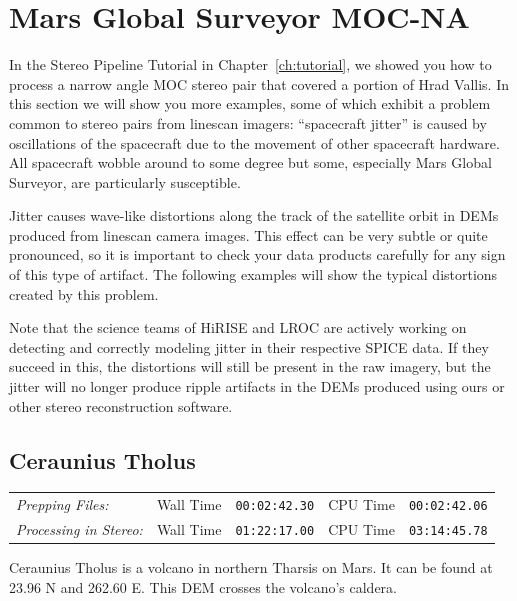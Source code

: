 \clearpage
\section{Mars Global Surveyor MOC-NA}

In the Stereo Pipeline Tutorial in Chapter~\ref{ch:tutorial}, we
showed you how to process a narrow angle \ac{MOC} stereo pair that
covered a portion of Hrad Vallis. In this section we will show you
more examples, some of which exhibit a problem common to stereo
pairs from linescan imagers: ``spacecraft jitter'' is caused by
oscillations of the spacecraft due to the movement of other spacecraft
hardware.  All spacecraft wobble around to some degree but some,
especially Mars Global Surveyor, are particularly susceptible.

Jitter causes wave-like distortions along the track of the satellite
orbit in \acp{DEM} produced from linescan camera images.  This effect can
be very subtle or quite pronounced, so it is important to check your
data products carefully for any sign of this type of artifact. The
following examples will show the typical distortions created by this
problem.

Note that the science teams of \ac{HiRISE} and \ac{LROC} are actively
working on detecting and correctly modeling jitter in their respective
SPICE data. If they succeed in this, the distortions will still
be present in the raw imagery, but the jitter will no longer produce
ripple artifacts in the DEMs produced using ours or other stereo
reconstruction software.

\subsection{Ceraunius Tholus}

\begin{tabular}{l r c r c}
\textit{Prepping Files:}       & Wall Time & \texttt{00:02:42.30} & CPU Time & \texttt{00:02:42.06} \\
\textit{Processing in Stereo:} & Wall Time & \texttt{01:22:17.00} & CPU Time & \texttt{03:14:45.78} \\
\end{tabular}

Ceraunius Tholus is a volcano in northern Tharsis on Mars. It can
be found at 23.96 N and 262.60 E. This \ac{DEM} crosses the volcano's
caldera.

